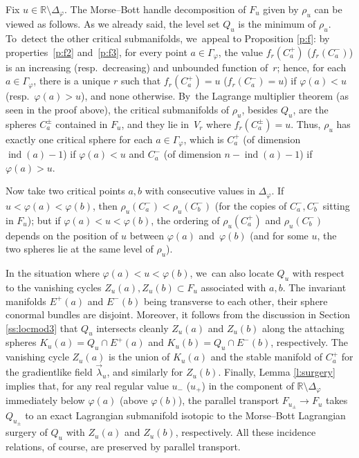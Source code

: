 \documentclass[10pt]{amsart}
\newcommand{\R}{{\mathbb R}}
\newcommand{\Crit}{\Gamma_{\!\varphi}}
\newcommand{\Discr}{\Delta_\varphi}
\newcommand{\ind}{\operatorname{ind}}
\theoremstyle{plain}
\theoremstyle{definition}
\begin{document}
Fix $u \in \R \setminus \Discr$. The Morse--Bott handle decomposition of $F_u$ given by
$\rho_u$ can be viewed as follows. As we already said, the level set $Q_u$ is
the minimum of $\rho_u$. To~detect the other critical submanifolds, we~appeal
to Proposition \ref{p:f}: by properties~\eqref{p:f2} and~\eqref{p:f3}, for every point $a \in \Crit$,
the value $f_r(C_a^+)$ (\resp $f_r(C_a^-)$) is an increasing (resp.~decreasing)
and unbounded function of~$r$; hence, for each $a \in \Crit$, there is a unique
$r$ such that $f_r(C_a^+) = u$ (\resp $f_r(C_a^-) = u$) if $\varphi(a) < u$
(resp.~$\varphi(a) > u$), and none otherwise. By~the Lagrange multiplier theorem
(as seen in the proof above), the critical submanifolds of $\rho_u$, besides
$Q_u$, are the spheres $C_a^\pm$ contained in $F_u$, and they lie in~$V_r$ where
$f_r(C_a^\pm) = u$. Thus, $\rho_u$ has exactly one critical sphere for each $a
\in \Crit$, which is $C_a^+$ (of dimension $\ind(a)-1$) if $\varphi(a) < u$ and
$C_a^-$ (of dimension $n-\ind(a)-1$) if $\varphi(a) > u$.

Now take two critical points $a, b$ with consecutive values in $\Discr$. If \hbox{$u
< \varphi(a) < \varphi(b)$}, then $\rho_u(C_a^-) < \rho_u(C_b^-)$ (for the copies
of $C_a^-, C_b^-$ sitting in $F_u$); but if \hbox{$\varphi(a) \!<\! u \!<\! \varphi(b)$}, the
ordering of $\rho_u(C_a^+)$ and $\rho_u(C_b^-)$ depends on the position of $u$
between $\varphi(a)$ and~$\varphi(b)$ (and for some $u$, the two spheres lie at
the same level of $\rho_u$).

In the situation where $\varphi(a) < u < \varphi(b)$, we~can also locate $Q_u$
with respect to the vanishing cycles $Z_u(a), Z_u(b) \subset F_u$ associated
with $a, b$. The invariant manifolds $E^+(a)$ and $E^-(b)$ being transverse to
each other, their sphere conormal bundles are disjoint. Moreover, it follows
from the discussion in Section \ref{ss:locmod3} that $Q_u$ intersects cleanly
$Z_u(a)$ and $Z_u(b)$ along the attaching spheres $K_u(a) = Q_u \cap E^+(a)$ and
\hbox{$K_u(b) = Q_u \cap E^-(b)$}, respectively. The vanishing cycle $Z_u(a)$ is the
union of $K_u(a)$ and the stable manifold of $C_a^+$ for the gradientlike field
$\vec\lambda_u$, and similarly for $Z_u(b)$. Finally, Lemma \ref{l:surgery}
implies that, for any real regular value $u_-$ (\resp $u_+$) in the component
of $\R \setminus \Discr$ immediately below $\varphi(a)$ (\resp above $\varphi(b)$), the
parallel transport $F_{u_\pm} \to F_u$ takes $Q_{u_\pm}$ to an exact Lagrangian
submanifold isotopic to the Morse--Bott Lagrangian surgery of $Q_u$ with
$Z_u(a)$ and $Z_u(b)$, respectively. All these incidence relations, of course,
are preserved by parallel transport.
\end{document}
